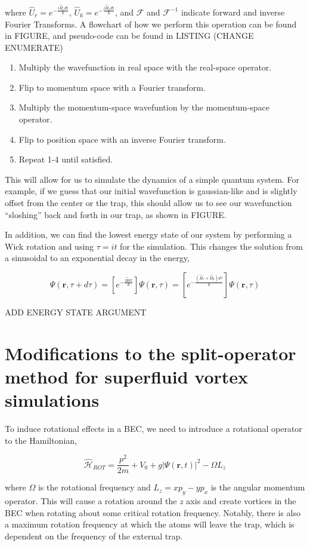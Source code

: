 where $\hat{U}_r = e^{-\frac{i\hat{H}_rdt}{\hbar}}$, $\hat{U}_k = e^{-\frac{i\hat{H}_kdt}{\hbar}}$, and $\mathcal{F}$ and $\mathcal{F}^{-1}$ indicate forward and inverse Fourier Transforms.
A flowchart of how we perform this operation can be found in FIGURE, and pseudo-code can be found in LISTING (CHANGE ENUMERATE)

\begin{enumerate}
\item Multiply the wavefunction in real space with the real-space operator.
\item Flip to momentum space with a Fourier transform.
\item Multiply the momentum-space wavefuntion by the momentum-space operator.
\item Flip to position space with an inverse Fourier transform.
\item Repeat 1-4 until satisfied.
\end{enumerate}

This will allow for us to simulate the dynamics of a simple quantum system.
For example, if we guess that our initial wavefunction is gaussian-like and is slightly offset from the center or the trap, this should allow us to see our wavefunction ``sloshing'' back and forth in our trap, as shown in FIGURE.

In addition, we can find the lowest energy state of our system by performing a Wick rotation and using $\tau = it$ for the simulation.
This changes the solution from a sinusoidal to an exponential decay in the energy,

$$
\Psi(\mathbf{r},\tau + d\tau) = \left[e^{-\frac{\hat{H}d\tau}{\hbar}}\right]\Psi(\mathbf{r},\tau) = \left[e^{-\frac{(\hat{H}_r + \hat{H}_k)d\tau}{\hbar}}\right]\Psi(\mathbf{r},\tau)
$$

ADD ENERGY STATE ARGUMENT

\section{Modifications to the split-operator method for superfluid vortex simulations}

To induce rotational effects in a BEC, we need to introduce a rotational operator to the Hamiltonian,

$$
\mathcal{\hat H}_{ROT} = \frac{p^2}{2m} + V_0 + g|\Psi(\mathbf{r},t)|^2 - \Omega L_z
$$

where $\Omega$ is the rotational frequency and $L_z = xp_y - yp_x$ is the angular momentum operator.
This will cause a rotation around the $z$ axis and create vortices in the BEC when rotating about some critical rotation frequency.
Notably, there is also a maximum rotation frequency at which the atoms will leave the trap, which is dependent on the frequency of the external trap.

